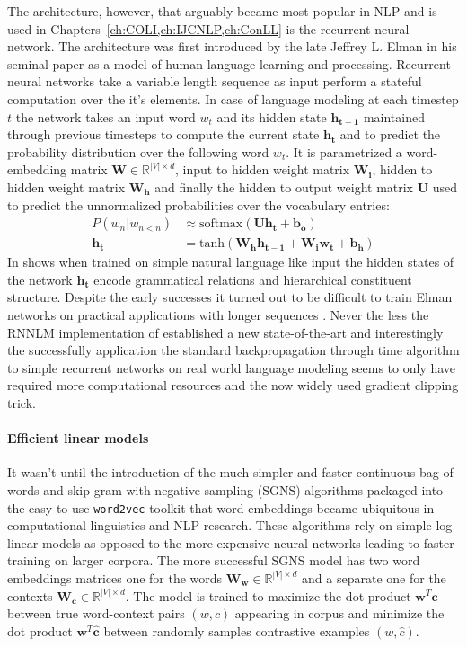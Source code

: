 The architecture, however, that arguably became most popular in NLP and is used in
Chapters~\ref{ch:COLI,ch:IJCNLP,ch:ConLL} is the recurrent neural network. The architecture was
first introduced by the late Jeffrey L. Elman in his seminal paper \citep{elman1990finding}
as a model of human language learning and processing. Recurrent neural networks
take a variable length sequence as input perform a stateful computation over the it's elements.
In case of language modeling at each timestep $t$ the network takes an input word $w_t$
and its hidden state $\mathbf{h_{t-1}}$ maintained through previous timesteps to compute the current
state $\mathbf{h_t}$ and to predict the probability distribution over the following word $w_t$. It is
parametrized a word-embedding matrix $\mathbf{W} \in \mathbb{R}^{|V| \times d}$, input to hidden weight
matrix $\mathbf{W_i}$, hidden to hidden weight matrix $\mathbf{W_h}$ and finally the hidden to output
weight matrix $\mathbf{U}$ used to predict the unnormalized probabilities over the vocabulary entries:
\begin{align}
P(w_n|w_{n<n}) &\approx \text{softmax}(\mathbf{U} \mathbf{h_t} + \mathbf{b_o}) \\
\mathbf{h_t} &= \text{tanh}(\mathbf{W_h}\mathbf{h_{t-1}} + \mathbf{W_i}\mathbf{w_t} + \mathbf{b_h})
\end{align}
In \cite{elman1991distributed} shows when trained on simple natural language like input the
hidden states of the network $\mathbf{h_t}$ encode grammatical relations and hierarchical
constituent structure. Despite the early successes it turned out to be difficult to train
Elman networks on practical applications with longer sequences
\cite{bengio1994learning}. Never the less the RNNLM implementation of \cite{mikolov2010recurrent}
established a new state-of-the-art and interestingly the successfully
application the standard backpropagation through time algorithm  \cite{williams1995gradient}
to simple recurrent networks on real world language modeling \cite{mikolov2012statistical}
seems to only have required more computational resources and the now widely used gradient clipping trick.

\paragraph{Efficient linear models}
It wasn't until the introduction of the much simpler and faster continuous bag-of-words
and skip-gram with negative sampling (SGNS) algorithms \cite{mikolov2013efficient}
packaged into the easy to use \texttt{word2vec} toolkit that
word-embeddings became ubiquitous in computational linguistics and NLP research.
These algorithms rely on simple log-linear models as opposed to the more expensive
neural networks leading to faster training on larger corpora. The more successful SGNS
model has two word embeddings matrices one for the words
$\mathbf{W_w}  \in \mathbb{R}^{|V| \times d}$
and a separate one for the contexts $\mathbf{W_c} \in \mathbb{R}^{|V| \times d}$.
The model is trained to maximize the dot product $\mathbf{w}^T\mathbf{c}$
between true word-context pairs $(w,c)$ appearing in corpus and minimize the
dot product $\mathbf{w}^T\mathbf{\hat{c}}$ between randomly
samples contrastive examples $(w,\hat{c})$.

